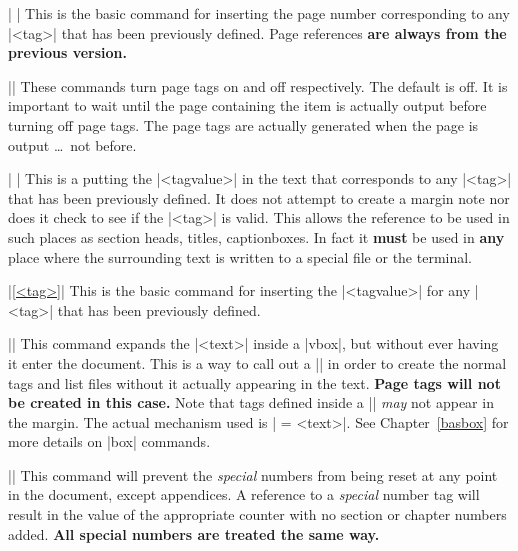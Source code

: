 \mbr
\ext\@|\pageref{<tag>}  |
\nbr
This is the basic command for inserting the 
page number corresponding to any |<tag>| that has been previously
defined. Page references {\bf are always from the previous version.}

\mbr
\ext\@|\pagetagson \pagetagsoff|
\nbr 
These commands turn page tags on and off respectively. The default is off. 
It is important to wait until the page containing the item is actually output
before turning off page tags. The page tags are actually generated when the
page is output \dots\ not before. 


\mbr
\ext\@| |
\nbr
This is a putting the |<tagvalue>| in the text that corresponds to any
|<tag>| 
that has been previously
defined. It does not attempt to create a margin note nor does it
check to see if the |<tag>| is valid. This allows the 
reference to be used in such places as section heads, titles, captionboxes. 
In fact it {\bf must} be used in {\bf any}  place where the surrounding text is
written to a special file or the terminal. 



\mbr
\ext\@|\ref{<tag>}|
\nbr
This is the basic command for inserting the 
|<tagvalue>| for any |<tag>| that has been previously
defined. 


\mbr
\ext\@||
\nbr
This command expands the |<text>| inside a |vbox|, but without ever having it
enter the document. This is a way to call out a |\figureinsert| in order to
create the normal tags and list files without it actually appearing in the text.
{\bf Page tags will not be created in this case.} 
Note that tags defined inside a |\silent| {\it may} not appear in the 
margin. The actual mechanism used is 
| = \vbox{<text>}|. See Chapter~\ref{basbox} for more details on
|box| commands.

\mbr
\ext\@|\specialnumberscontinuous|
\nbr
This command will prevent the {\it special} numbers from being reset at any
point in the document, except appendices. A reference to a {\it special} number
tag will result in the value of the appropriate counter with no section or
chapter numbers added. {\bf All special numbers are treated the same way.}


\endblockmode

\ejectpage
\marginnotesfalse
\done
